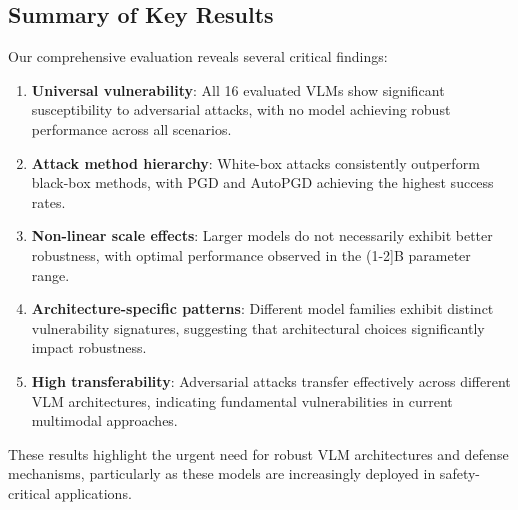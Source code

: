 \subsection{Summary of Key Results}

Our comprehensive evaluation reveals several critical findings:

\begin{enumerate}
    \item \textbf{Universal vulnerability}: All 16 evaluated VLMs show significant susceptibility to adversarial attacks, with no model achieving robust performance across all scenarios.

    \item \textbf{Attack method hierarchy}: White-box attacks consistently outperform black-box methods, with PGD and AutoPGD achieving the highest success rates.

    \item \textbf{Non-linear scale effects}: Larger models do not necessarily exhibit better robustness, with optimal performance observed in the (1-2]B parameter range.

    \item \textbf{Architecture-specific patterns}: Different model families exhibit distinct vulnerability signatures, suggesting that architectural choices significantly impact robustness.

    \item \textbf{High transferability}: Adversarial attacks transfer effectively across different VLM architectures, indicating fundamental vulnerabilities in current multimodal approaches.
\end{enumerate}

These results highlight the urgent need for robust VLM architectures and defense mechanisms, particularly as these models are increasingly deployed in safety-critical applications.